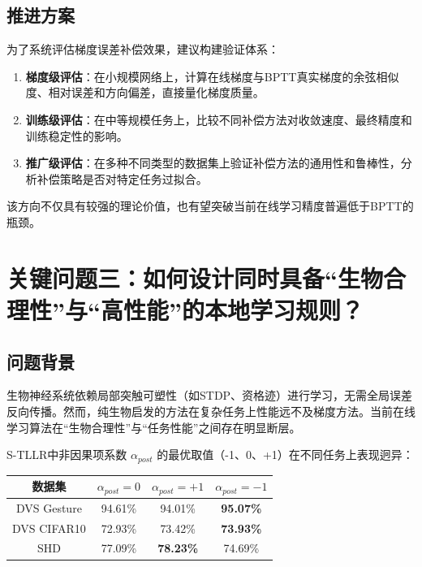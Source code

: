 \documentclass[journal,12pt,onecolumn]{IEEEtran}
\begin{document}
\subsection{推进方案}

为了系统评估梯度误差补偿效果，建议构建验证体系：

\begin{enumerate}
    \item \textbf{梯度级评估}：在小规模网络上，计算在线梯度与BPTT真实梯度的余弦相似度、相对误差和方向偏差，直接量化梯度质量。
    \item \textbf{训练级评估}：在中等规模任务上，比较不同补偿方法对收敛速度、最终精度和训练稳定性的影响。
    \item \textbf{推广级评估}：在多种不同类型的数据集上验证补偿方法的通用性和鲁棒性，分析补偿策略是否对特定任务过拟合。
\end{enumerate}

该方向不仅具有较强的理论价值，也有望突破当前在线学习精度普遍低于BPTT的瓶颈。

\section{关键问题三：如何设计同时具备“生物合理性”与“高性能”的本地学习规则？}

\subsection{问题背景}

生物神经系统依赖局部突触可塑性（如STDP、资格迹）进行学习，无需全局误差反向传播。然而，纯生物启发的方法在复杂任务上性能远不及梯度方法。当前在线学习算法在“生物合理性”与“任务性能”之间存在明显断层。

S-TLLR中非因果项系数 \(\alpha_{post}\) 的最优取值（-1、0、+1）在不同任务上表现迥异：

\begin{center}
\begin{tabular}{c|c|c|c}
\hline
数据集 & \(\alpha_{post}=0\) & \(\alpha_{post}=+1\) & \(\alpha_{post}=-1\) \\
\hline
DVS Gesture & 94.61\% & 94.01\% & \textbf{95.07\%} \\
DVS CIFAR10 & 72.93\% & 73.42\% & \textbf{73.93\%} \\
SHD & 77.09\% & \textbf{78.23\%} & 74.69\% \\
\hline
\end{tabular}
\end{center}
\end{document}
